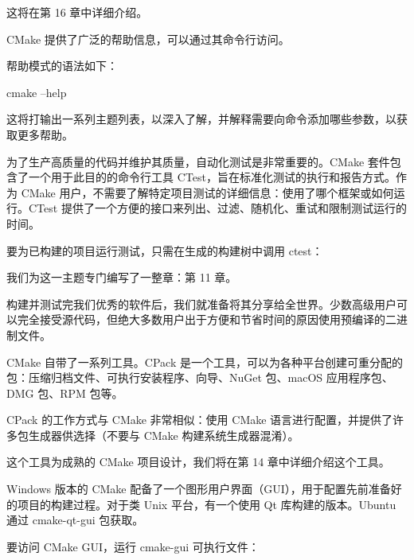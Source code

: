这将在第 16 章中详细介绍。


CMake 提供了广泛的帮助信息，可以通过其命令行访问。

帮助模式的语法如下：

\begin{shell}
cmake --help
\end{shell}

这将打输出一系列主题列表，以深入了解，并解释需要向命令添加哪些参数，以获取更多帮助。


为了生产高质量的代码并维护其质量，自动化测试是非常重要的。CMake 套件包含了一个用于此目的的命令行工具 CTest，旨在标准化测试的执行和报告方式。作为 CMake 用户，不需要了解特定项目测试的详细信息：使用了哪个框架或如何运行。CTest 提供了一个方便的接口来列出、过滤、随机化、重试和限制测试运行的时间。

要为已构建的项目运行测试，只需在生成的构建树中调用 ctest：


我们为这一主题专门编写了一整章：第 11 章。


构建并测试完我们优秀的软件后，我们就准备将其分享给全世界。少数高级用户可以完全接受源代码，但绝大多数用户出于方便和节省时间的原因使用预编译的二进制文件。

CMake 自带了一系列工具。CPack 是一个工具，可以为各种平台创建可重分配的包：压缩归档文件、可执行安装程序、向导、NuGet 包、macOS 应用程序包、DMG 包、RPM 包等。

CPack 的工作方式与 CMake 非常相似：使用 CMake 语言进行配置，并提供了许多包生成器供选择（不要与 CMake 构建系统生成器混淆）。

这个工具为成熟的 CMake 项目设计，我们将在第 14 章中详细介绍这个工具。


Windows 版本的 CMake 配备了一个图形用户界面（GUI），用于配置先前准备好的项目的构建过程。对于类 Unix 平台，有一个使用 Qt 库构建的版本。Ubuntu 通过 cmake-qt-gui 包获取。

要访问 CMake GUI，运行 cmake-gui 可执行文件：


